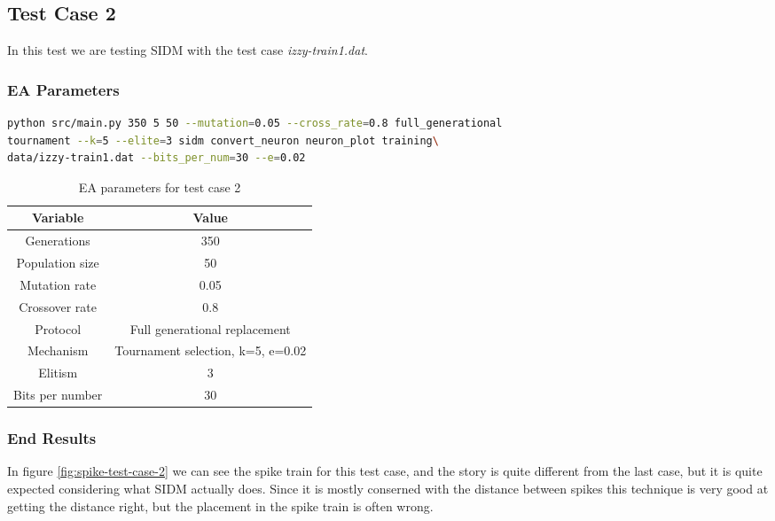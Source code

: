 \subsection{Test Case 2}\label{sec:test-case-2}
In this test we are testing SIDM with the test case
\textit{izzy-train1.dat}.
\subsubsection{EA Parameters}\label{sec:test-case-2-parameters}
\begin{lstlisting}[frame=single, language=bash, caption=Command-line to
replicate the results]
python src/main.py 350 5 50 --mutation=0.05 --cross_rate=0.8 full_generational
tournament --k=5 --elite=3 sidm convert_neuron neuron_plot training\
data/izzy-train1.dat --bits_per_num=30 --e=0.02
\end{lstlisting}
\begin{table}
	\begin{tabular}{c c}
		Variable & Value \\
		\hline
		Generations & 350 \\
		\hline
		Population size & 50 \\
		\hline
		Mutation rate & 0.05 \\
		\hline
		Crossover rate & 0.8 \\
		\hline
		Protocol & Full generational replacement \\
		\hline
		Mechanism & Tournament selection, k=5, e=0.02 \\
		\hline
		Elitism & 3 \\
		\hline
		Bits per number & 30 \\
	\end{tabular}
	\caption{EA parameters for test case 2}
\end{table}
\subsubsection{End Results}\label{sec:test-case-2-results}
In figure \ref{fig:spike-test-case-2} we can see the spike train for this test
case, and the story is quite different from the last case, but it is quite
expected considering what SIDM actually does. Since it is mostly conserned with
the distance between spikes this technique is very good at getting the distance
right, but the placement in the spike train is often wrong.

